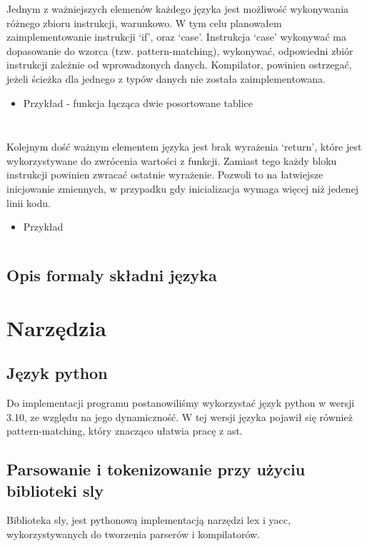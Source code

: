 \documentclass{article}
\begin{document}
\inputminted[firstline=15]{javascript}{examples/currying.uwu.js}


Jednym z ważniejszych elemenów każdego języka jest możliwość wykonywania różnego zbioru instrukcji, warunkowo. W tym celu planowałem zaimplementowanie instrukcji `if', oraz `case'. Instrukcja `case' wykonywać ma dopasowanie do wzorca (tzw. pattern-matching), wykonywać, odpowiedni zbiór instrukcji zależnie od wprowadzonych danych. Kompilator, powinien ostrzegać, jeżeli ścieżka dla jednego z typów danych nie została zaimplementowana.

\begin{itemize}
  \newpage
  \item Przykład - funkcja łącząca dwie posortowane tablice
        \inputminted[firstline=25]{uwu.py -x}{examples/merge.uwu}
        \inputminted[firstline=20]{javascript}{examples/merge.uwu.js}
\end{itemize}

\newpage
Kolejnym dość ważnym elementem języka jest brak wyrażenia `return', które jest wykorzystywane do zwrócenia wartości z funkcji. Zamiast tego każdy bloku instrukcji powinien zwracać ostatnie wyrażenie. Pozwoli to na łatwiejsze inicjowanie zmiennych, w przypadku gdy inicializacja wymaga więcej niż jedenej linii kodu.



\begin{itemize}
  \item Przykład
        \inputminted[firstline=15]{javascript}{examples/return.uwu.js}
\end{itemize}
\subsection{Opis formaly składni języka}
\section{Narzędzia}
\subsection{Język python}
Do implementacji programu postanowiliśmy wykorzystać język python w wersji 3.10, ze względu na jego dynamiczność.
W tej wersji języka pojawił się również pattern-matching, który znacząco ułatwia pracę z ast.
\subsection{Parsowanie i tokenizowanie przy użyciu biblioteki sly}
Biblioteka sly, jest pythonową implementacją narzędzi lex i yacc, wykorzystywanych do tworzenia parserów i kompilatorów.
\end{document}
